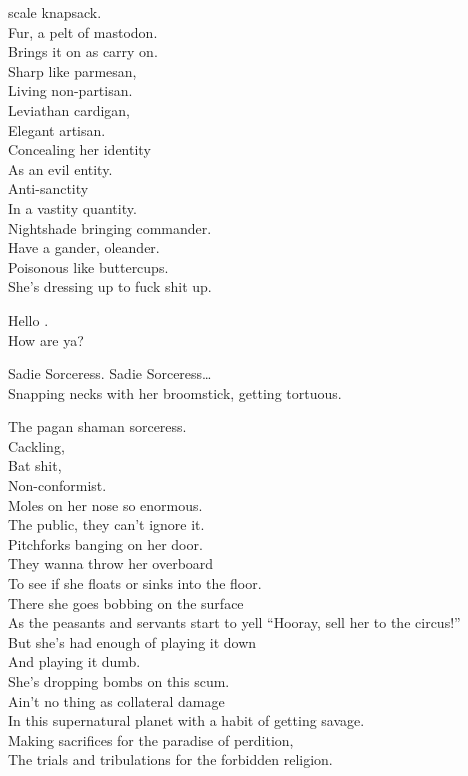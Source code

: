  scale knapsack. \\
Fur, a pelt of mastodon. \\
Brings it on as carry on. \\
Sharp like parmesan, \\
Living non-partisan. \\
Leviathan cardigan, \\
Elegant artisan. \\
Concealing her identity \\
As an evil entity. \\
Anti-sanctity \\
In a vastity quantity. \\
Nightshade bringing  commander. \\
Have a gander, oleander. \\
Poisonous like buttercups. \\
She's dressing up to fuck shit up. \\


Hello . \\
How are ya? \\


Sadie Sorceress. Sadie Sorceress… \\
Snapping necks with her broomstick, getting tortuous. \\


The pagan shaman sorceress. \\
Cackling, \\
Bat shit, \\
Non-conformist. \\
Moles on her nose so enormous. \\
The public, they can't ignore it. \\
Pitchforks banging on her door. \\
They wanna throw her overboard \\
To see if she floats or sinks into the floor. \\
There she goes bobbing on the surface \\
As the peasants and servants start to yell
``Hooray, sell her to the circus!'' \\
But she's had enough of playing it down \\
And playing it dumb. \\
She's dropping bombs on this  scum. \\
Ain't no thing as collateral damage \\
In this supernatural planet with a habit of getting savage. \\
Making sacrifices for the paradise of perdition, \\
The trials and tribulations for the forbidden religion. \\


